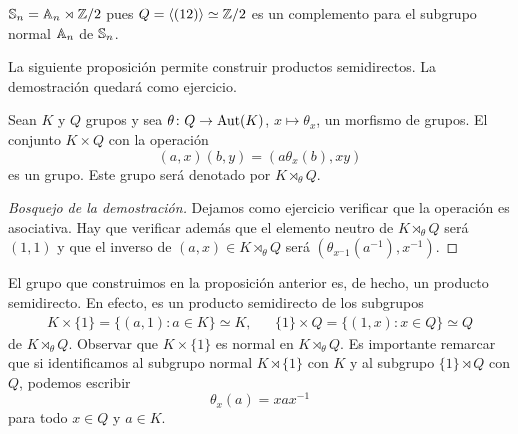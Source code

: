 \begin{example}
$\mathbb{S}_n=\mathbb{A}_n\rtimes\mathbb{Z}/2$ pues $Q=\langle (12)\rangle\simeq\mathbb{Z}/2$ es un complemento para el subgrupo normal $\mathbb{A}_n$ de $\mathbb{S}_n$. 
\end{example}

La siguiente proposición permite construir productos semidirectos. La demostración quedará como ejercicio. 

\begin{proposition}
Sean $K$ y $Q$ grupos y sea $\theta\colon Q\to\operatorname{Aut}(K)$, $x\mapsto\theta_x$, un morfismo de grupos. 
El conjunto $K\times Q$ con la operación
\[
(a,x)(b,y)=(a\theta_x(b),xy)
\]
es un grupo. Este grupo será denotado por $K\rtimes_\theta Q$. 
\end{proposition}

\begin{proof}[Bosquejo de la demostración]
Dejamos como ejercicio verificar que la operación es asociativa. Hay que verificar además que el elemento neutro de $K\rtimes_\theta Q$ será $(1,1)$ y
que el inverso de $(a,x)\in K\rtimes_\theta Q$ será $(\theta_{x^-1}(a^{-1}),x^{-1})$. 
\end{proof}

El grupo que construimos en la proposición anterior es, de hecho, un producto semidirecto. En efecto, es un producto semidirecto de los subgrupos  
\begin{align*}
K\times\{1\}=\{(a,1):a\in K\}\simeq K,&&
\{1\}\times Q=\{(1,x):x\in Q\}\simeq Q
\end{align*}
de $K\rtimes_\theta Q$. Observar que $K\times\{1\}$ es normal en $K\rtimes_\theta Q$. Es importante remarcar que si identificamos al subgrupo normal $K\rtimes\{1\}$ con $K$ y al subgrupo  
$\{1\}\rtimes Q$ con $Q$, podemos escribir 
\[
\theta_x(a)=xax^{-1}
\]
para todo $x\in Q$ y $a\in K$.

%
%

